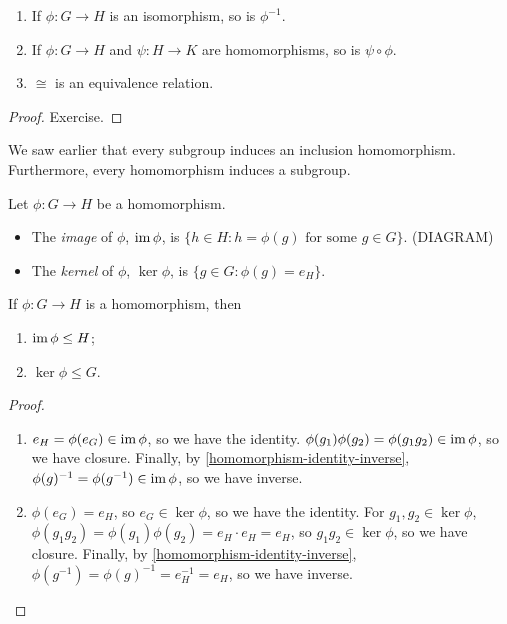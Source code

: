 \documentclass{../template/note}
\begin{document}
    \begin{lemma}
        \begin{enumerate}
            \item If \(\phi: G \to H\) is an isomorphism, so is \(\phi^{-1}\).
            \item If \(\phi: G \to H\) and \(\psi: H \to K\) are homomorphisms, so is \(\psi \circ \phi\).
            \item \(\cong\) is an equivalence relation.
        \end{enumerate}
    \end{lemma}
    
    \begin{proof}
        Exercise.
    \end{proof}
    
    We saw earlier that every subgroup induces an inclusion homomorphism. Furthermore, every homomorphism induces a subgroup.

    \begin{definition}
        Let \(\phi: G \to H\) be a homomorphism.
        \begin{itemize}
            \item The \emph{image} of \(\phi\), \(\operatorname{im} \phi \), is \(\{h \in H: h = \phi(g) \text{ for some } g \in G\}\). (DIAGRAM)
            \item The \emph{kernel} of \(\phi\), \(\ker \phi\), is \(\{g \in G: \phi(g) = e_H\}\).
        \end{itemize}        
    \end{definition}
    
    \begin{proposition}
        If \(\phi: G \to H\) is a homomorphism, then
        \begin{enumerate}
            \item \(\operatorname{im} \phi \leq H\);
            \item \(\ker \phi \leq G\).
        \end{enumerate}
    \end{proposition}
    
    \begin{proof}
        \begin{enumerate}
            \item \(e_H = \phi(e_G) \in \operatorname{im} \phi\), so we have the identity. \(\phi(g_1)\phi(g_2) = \phi(g_1g_2) \in \operatorname{im} \phi\), so we have closure. Finally, by \cref{homomorphism-identity-inverse}, \(\phi(g)^{-1} = \phi(g^{-1}) \in \operatorname{im} \phi\), so we have inverse.
            \item \(\phi(e_G) = e_H\), so \(e_G \in \ker \phi\), so we have the identity. For \(g_1, g_2 \in \ker \phi\), \(\phi(g_1g_2) = \phi(g_1)\phi(g_2) = e_H \cdot e_H = e_H\), so \(g_1g_2 \in \ker \phi\), so we have closure. Finally, by \cref{homomorphism-identity-inverse}, \(\phi(g^{-1}) = \phi(g)^{-1} = e_H^{-1} = e_H\), so we have inverse.
        \end{enumerate}
    \end{proof}
    
\end{document}

